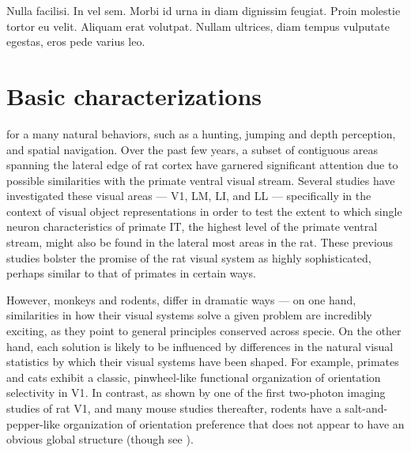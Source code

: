 \begin{savequote}[75mm]
Nulla facilisi. In vel sem. Morbi id urna in diam dignissim feugiat. Proin molestie tortor eu velit. Aliquam erat volutpat. Nullam ultrices, diam tempus vulputate egestas, eros pede varius leo.
\end{savequote}

\chapter{Basic characterizations}



 for a many natural behaviors, such as a hunting\cite{REFREF}, jumping and depth perception\cite{REFREF}, and spatial navigation\cite{REFREF}. Over the past few years, a subset of contiguous areas spanning the lateral edge of rat cortex have garnered significant attention due to possible similarities with the primate ventral visual stream. Several studies \cite{Vermaercke2014, Tafazoli2017, Vinken2016NeuralCortex} have investigated these visual areas --- V1, LM, LI, and LL --- specifically in the context of visual object representations in order to test the extent to which single neuron characteristics of primate IT, the highest level of the primate ventral stream, might also be found in the lateral most areas in the rat. These previous studies bolster the promise of the rat visual system as highly sophisticated, perhaps similar to that of primates in certain ways. 

However, monkeys and rodents, differ in dramatic ways --- on one hand, similarities in how their visual systems solve a given problem are incredibly exciting, as they point to general principles conserved across specie. On the other hand, each solution is likely to be influenced by differences in the natural visual statistics by which their visual systems have been shaped. For example, primates and cats exhibit a classic, pinwheel-like functional organization of orientation selectivity in V1\cite{REFREF}. In contrast, as shown by one of the first two-photon imaging studies of rat V1, and many mouse studies thereafter, rodents have a salt-and-pepper-like organization of orientation preference that does not appear to have an obvious global structure (though see \cite{REFREF}). 

